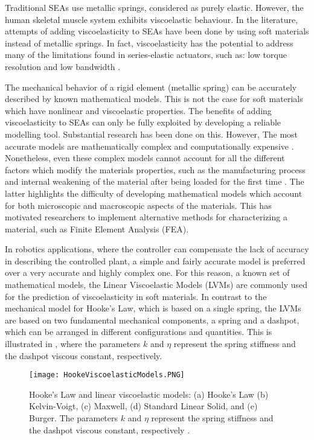 Traditional SEAs use metallic springs, considered as purely elastic. However, the human skeletal muscle system exhibits viscoelastic behaviour. In the literature, attempts of adding viscoelasticity to SEAs have been done by using soft materials instead of metallic springs. In fact, viscoelasticity has the potential to address many of the limitations found in series-elastic actuators, such as: low torque resolution and low bandwidth \cite{martins2015polyurethane,tagliamonte2014rendering,schepelmann2014compact}. 

The mechanical behavior of a rigid element (metallic spring) can be accurately described by known mathematical models. This is not the case for soft materials which have nonlinear and viscoelastic properties. The benefits of adding viscoelasticity to SEAs can only be fully exploited by developing a  reliable modelling tool. Substantial research has been done on this. However, The most accurate models are mathematically complex and computationally expensive \cite{xu2014mathematical,ciniello2017identifying,lu2017constitutive}. Nonetheless, even these complex models cannot account for all the different  factors which modify the materials properties, such as the manufacturing process and internal weakening of the material after being loaded for the first time \cite{case2015soft}. The latter highlights the difficulty of developing mathematical models which account for both microscopic and macroscopic aspects of the materials. This has motivated researchers to implement alternative methods for characterizing a material, such as Finite Element Analysis (FEA).

In robotics applications, where the controller can compensate the lack of accuracy in describing the controlled plant, a simple and fairly accurate model is preferred over a very accurate and highly complex one. For this reason, a known set of mathematical models, the Linear Viscoelastic Models (LVMs) are commonly used for the prediction of viscoelasticity in soft materials. In contrast to the mechanical model for Hooke's Law, which is based on a single spring, the LVMs are based on two fundamental mechanical components, a spring and a dashpot, which can be arranged in different configurations and quantities. This is illustrated in , where the parameters $k$ and $\eta$ represent the spring stiffness and the dashpot viscous constant, respectively.

\begin{figure}[hbt!]
	\centering
    \texttt{[image: HookeViscoelasticModels.PNG]}
    \caption{Hooke's Law and linear viscoelastic models: (a) Hooke's Law (b) Kelvin-Voigt, (c) Maxwell, (d) Standard Linear Solid, and (e) Burger. The parameters $k$ and $\eta$ represent the spring stiffness and the dashpot viscous constant, respectively \cite{austin2015control}. }
    \label{fig:LinearViscoelasticModels}
\end{figure}

